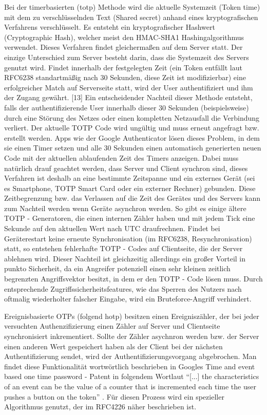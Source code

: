 Bei der timerbasierten (\ac{totp}) Methode wird die aktuelle Systemzeit (Token time) mit dem zu verschlüsselnden Text (Shared secret) anhand eines kryptografischen Verfahrens verschlüsselt. Es entsteht ein kryptografischer Hashwert (Cryptographic Hash), welcher meist den HMAC-SHA1 Hashingalgorithmus verwendet. Dieses Verfahren findet gleichermaßen auf dem Server statt. Der einzige Unterschied zum Server besteht darin, dass die Systemzeit des Servers genutzt wird. Findet innerhalb der festgelegten Zeit (ein Token entfällt laut RFC6238 standartmäßig nach 30 Sekunden, diese Zeit ist modifizierbar) eine erfolgreicher Match auf Serverseite statt, wird der User authentifiziert und ihm der Zugang gewährt. [13] Ein entscheidender Nachteil dieser Methode entsteht, falls der authentifizierende User innerhalb dieser 30 Sekunden (beispielsweise) durch eine Störung des Netzes oder einen kompletten Netzausfall die Verbindung verliert. Der aktuelle TOTP Code wird ungültig und muss erneut angefragt bzw. erstellt werden. Apps wie der Google Authenticator lösen dieses Problem, in dem sie einen Timer setzen und alle 30 Sekunden einen automatisch generierten neuen Code mit der aktuellen ablaufenden Zeit des Timers anzeigen. Dabei muss natürlich drauf geachtet werden, dass Server und Client synchron sind, dieses Verfahren ist deshalb an eine bestimmte Zeitspanne und ein externes Gerät (sei es Smartphone, TOTP Smart Card oder ein externer Rechner) gebunden. Diese Zeitbegrenzung bzw. das Verlassen auf die Zeit des Gerätes und des Servers kann zum Nachteil werden wenn Geräte asynchron werden. So gibt es einige ältere TOTP - Generatoren, die einen internen Zähler haben und mit jedem Tick eine Sekunde auf den aktuellen Wert nach UTC draufrechnen. Findet bei Geräterestart keine erneute Synchronisation (im RFC6238, Resynchronisation) statt, so entstehen fehlerhafte TOTP - Codes auf Clientseite, die der Server ablehnen wird. Dieser Nachteil ist gleichzeitig allerdings ein großer Vorteil in punkto Sicherheit, da ein Angreifer potenziell einen sehr kleinen zeitlich begrenzten Angriffsvektor besitzt, in dem er den TOTP - Code lösen muss. Durch entsprechende Zugriffssicherheitsfeatures, wie das Sperren des Nutzers nach oftmalig wiederholter falscher Eingabe, wird ein Bruteforce-Angriff verhindert.

Ereignisbasierte OTPs (folgend \ac{hotp}) besitzen einen Ereigniszähler, der bei jeder versuchten Authenzifizierung einen Zähler auf Server und Clientseite synchronisiert inkrementiert. Sollte der Zähler asychnron werden bzw. der Server einen anderen Wert gespeichert haben als der Client bei der nächsten Authentifizierung sendet, wird der Authentifizierungsvorgang abgebrochen. Man findet diese Funktionalität wortwörtlich beschrieben in Googles Time and event based one time password - Patent \cite{A6} in folgendem Wortlaut ``[...] the characteristics of an event can be the value of a counter that is incremented each time the user pushes a button on the token'' \cite{A6}. Für diesen Prozess wird ein spezieller Algorithmus genutzt, der im RFC4226 näher beschrieben ist.

